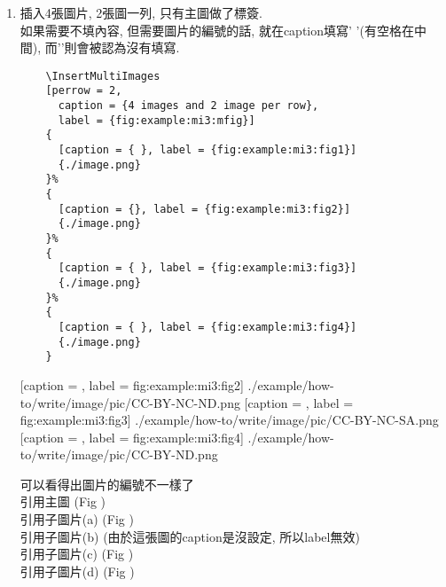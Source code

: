 \begin{enumerate}
{    e.g: 
    引用主圖 (Fig ) ,
    引用子圖片 (Fig , Fig ).
  } %

  \newpage
  \item
  {
    插入4張圖片, 2張圖一列, 只有主圖做了標簽.\\
    如果需要不填內容, 但需要圖片的編號的話, 就在caption填寫'{ }'(有空格在中間), 而'{}'則會被認為沒有填寫.
    \begin{verbatim}
    \InsertMultiImages
    [perrow = 2,
      caption = {4 images and 2 image per row},
      label = {fig:example:mi3:mfig}]
    {
      [caption = { }, label = {fig:example:mi3:fig1}]
      {./image.png}
    }%
    {
      [caption = {}, label = {fig:example:mi3:fig2}]
      {./image.png}
    }%
    {
      [caption = { }, label = {fig:example:mi3:fig3}]
      {./image.png}
    }%
    {
      [caption = { }, label = {fig:example:mi3:fig4}]
      {./image.png}
    }
    \end{verbatim}

    {
      [caption = {},
      label = {fig:example:mi3:fig2}]
      {./example/how-to/write/image/pic/CC-BY-NC-ND.png}
    }%
    {
      [caption = { },
      label = {fig:example:mi3:fig3}]
      {./example/how-to/write/image/pic/CC-BY-NC-SA.png}
    }%
    {
      [caption = { },
      label = {fig:example:mi3:fig4}]
      {./example/how-to/write/image/pic/CC-BY-ND.png}
    }

    可以看得出圖片的編號不一樣了\\
    引用主圖 (Fig )\\
    引用子圖片(a) (Fig )\\
    引用子圖片(b) (由於這張圖的caption是沒設定, 所以label無效)\\
    引用子圖片(c) (Fig )\\
    引用子圖片(d) (Fig )
  } %


\end{enumerate}
